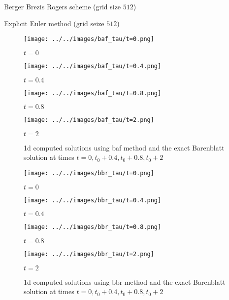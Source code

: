\documentclass{jsarticle}
\theoremstyle{definition}
\begin{document}
\begin{table}[hbtp]
    \caption{Berger Brezis Rogers scheme (grid size $512$)}
    \label{table:bbr_test}
    \centering
    
\end{table}

\begin{table}[hbtp]
    \caption{Explicit Euler method (grid seize $512$)}
    \label{table:baf_test}
    \centering
    
\end{table}

  \begin{figure}
    \centering
    \begin{minipage}{0.4\hsize}
        \texttt{[image: ../../images/baf\_tau/t=0.png]}
        \caption{$t = 0$}
    \end{minipage}
    \begin{minipage}{0.4\hsize}
        \texttt{[image: ../../images/baf\_tau/t=0.4.png]}
        \caption{$t = 0.4$}
    \end{minipage}
    \begin{minipage}{0.4\hsize}
        \texttt{[image: ../../images/baf\_tau/t=0.8.png]}
        \caption{$t = 0.8$}
    \end{minipage}
    \begin{minipage}{0.4\hsize}
        \texttt{[image: ../../images/baf\_tau/t=2.png]}
        \caption{$t = 2$}
    \end{minipage}
    \caption{1d computed solutions using baf method and the exact Barenblatt solution at times $t  = 0, t_0 + 0.4, t_0 + 0.8, t_0 + 2$}
\end{figure}

\begin{figure}
    \centering
    \begin{minipage}{0.4\hsize}
        \texttt{[image: ../../images/bbr\_tau/t=0.png]}
        \caption{$t = 0$}
    \end{minipage}
    \begin{minipage}{0.4\hsize}
        \texttt{[image: ../../images/bbr\_tau/t=0.4.png]}
        \caption{$t = 0.4$}
    \end{minipage}
    \begin{minipage}{0.4\hsize}
        \texttt{[image: ../../images/bbr\_tau/t=0.8.png]}
        \caption{$t = 0.8$}
    \end{minipage}
    \begin{minipage}{0.4\hsize}
        \texttt{[image: ../../images/bbr\_tau/t=2.png]}
        \caption{$t = 2$}
    \end{minipage}
    \caption{1d computed solutions using bbr method and the exact Barenblatt solution at times $t  = 0, t_0 + 0.4, t_0 + 0.8, t_0 + 2$}
\end{figure}
\end{document}
